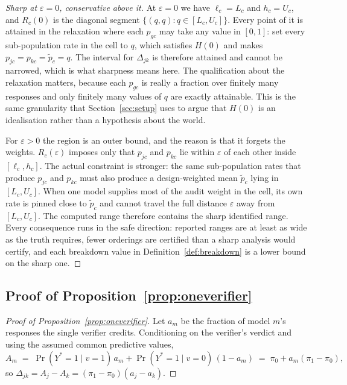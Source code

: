 \begin{proof}[Sharp at $\varepsilon = 0$, conservative above it]
At $\varepsilon = 0$ we have $\ell_c = L_c$ and $h_c = U_c$, and $R_c(0)$ is the diagonal
segment $\{(q,q) : q \in [L_c, U_c]\}$. Every point of it is attained in the relaxation where
each $p_{gc}$ may take any value in $[0,1]$: set every sub-population rate in the cell to $q$,
which satisfies $H(0)$ and makes $p_{jc} = p_{kc} = \tilde p_c = q$. The interval for
$\Delta_{jk}$ is therefore attained and cannot be narrowed, which is what sharpness means
here. The qualification about the relaxation matters, because each $p_{gc}$ is really a
fraction over finitely many responses and only finitely many values of $q$ are exactly
attainable. This is the same granularity that Section~\ref{sec:setup} uses to argue that
$H(0)$ is an idealisation rather than a hypothesis about the world.

For $\varepsilon > 0$ the region is an outer bound, and the reason is that it forgets the
weights. $R_c(\varepsilon)$ imposes only that $p_{jc}$ and $p_{kc}$ lie within $\varepsilon$
of each other inside $[\ell_c, h_c]$. The actual constraint is stronger: the same
sub-population rates that produce $p_{jc}$ and $p_{kc}$ must also produce a design-weighted
mean $\tilde p_c$ lying in $[L_c, U_c]$. When one model supplies most of the audit weight in
the cell, its own rate is pinned close to $\tilde p_c$ and cannot travel the full distance
$\varepsilon$ away from $[L_c,U_c]$. The computed range therefore contains the sharp
identified range. Every consequence runs in the safe direction: reported ranges are at least
as wide as the truth requires, fewer orderings are certified than a sharp analysis would
certify, and each breakdown value in Definition~\ref{def:breakdown} is a lower bound on the
sharp one.
\end{proof}

\subsection{Proof of Proposition~\ref{prop:oneverifier}}

\begin{proof}[Proof of Proposition~\ref{prop:oneverifier}]
Let $a_m$ be the fraction of model $m$'s responses the single verifier credits. Conditioning
on the verifier's verdict and using the assumed common predictive values,
\[
A_m \;=\; \Pr(Y^\ast = 1 \mid v = 1)\, a_m + \Pr(Y^\ast = 1 \mid v = 0)\,(1 - a_m)
\;=\; \pi_0 + a_m (\pi_1 - \pi_0),
\]
so $\Delta_{jk} = A_j - A_k = (\pi_1 - \pi_0)(a_j - a_k)$.
\end{proof}

